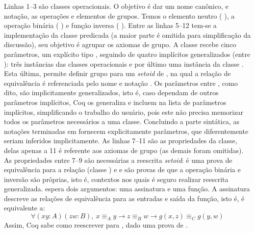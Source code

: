 Linhas 1--3 são classes operacionais. O objetivo é dar um nome canônico, e notação, as operações e elementos de grupos. Temos o elemento neutro (  ), a operação binária (  \coqinline{+}) e função inversa (  \coqinline{-}). Entre as linhas 5--12 tem-se a implementação da classe predicada  (a maior parte é omitida para simplificação da discussão), seu objetivo é agrupar os axiomas de grupo. A classe recebe cinco parâmetros, um explícito tipo , seguindo de quatro implícitos generalizados (entre ): três instâncias das classes operacionais e por último uma instância da classe . Esta última, permite definir grupo para um \textit{setoid} de , na qual a relação de equivalência é referenciada pelo nome  e notação  . Os parâmetros entre , como dito, são implicitamente generalizados, isto é, caso dependam de outros parâmetros implícitos, Coq os generaliza e incluem na lista de parâmetros implícitos, simplificando o trabalho do usuário, pois este não precisa memorizar todos os parâmetros necessários a uma classe. Concluindo a parte sintática, as notações terminadas em  fornecem explicitamente parâmetros, que diferentemente seriam inferidos implicitamente. As linhas 7--11 são as propriedades da classe, delas apenas a 11 é referente aos axiomas de grupo (as demais foram omitidas). As propriedades entre 7--9 são necessárias a reescrita \textit{setoid}:  é uma prova de equivalência para a relação  (classe ) e  e  são provas de que a operação binária e inversão são próprias, isto é, contextos nos quais é seguro realizar reescrita generalizada.  espera dois argumentos: uma assinatura e uma função. A assinatura descreve as relações de equivalência para as entradas e saída da função, isto é,  é equivalente a:
\begin{equation*}\label{eq:proper}
	\forall (x y : A) (z w : B),~x \equiv_A y \rightarrow z \equiv_B w \rightarrow g(x,z) \equiv_C g(y,w)
\end{equation*}
Assim, Coq sabe como reescrever  para , dado uma prova de . 

